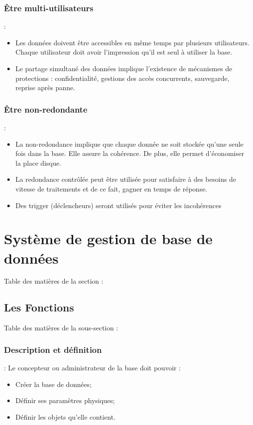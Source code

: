 \documentclass[10pt]{beamer}
\newcommand{\tocsss}{\begin{frame}[allowframebreaks]{Table des matières de la sous-section : \subsecname}
    \tableofcontents[
    currentsection,
    currentsubsection,
    hideothersubsections,
    sectionstyle=hide/hide
]
\end{frame}}
\newcommand{\tocss}{
    \begin{frame}[allowframebreaks]{Table des matières de la section : \secname}
    \tableofcontents[
        currentsection,
        currentsubsection,
        hideothersubsections,
        sectionstyle=show/hide,
    ]
\end{frame}}
\begin{document}
\subsubsection{Être multi-utilisateurs}
\begin{frame}{\subsecname : \subsubsecname}
    \begin{itemize}
        \item Les données doivent être accessibles en même temps par plusieurs utilisateurs.
              Chaque utilisateur doit avoir l’impression qu’il est seul à utiliser la base.
        \item Le partage simultané des données implique l’existence de mécanismes de protections : confidentialité, gestions des accès concurrents, sauvegarde, reprise après panne.
    \end{itemize}
\end{frame}

\subsubsection{Être non-redondante}
\begin{frame}{\subsecname : \subsubsecname}
    \begin{itemize}
        \item La non-redondance implique que chaque donnée ne soit stockée qu’une seule fois dans la base.  Elle assure la cohérence. De plus, elle permet d’économiser la place disque.
        \item La redondance contrôlée peut être utilisée pour satisfaire à des besoins de vitesse de traitements et de ce fait, gagner en temps de réponse.
        \item Des trigger (déclencheurs) seront utilisés pour éviter les incohérences
    \end{itemize}
\end{frame}


\section{Système de gestion de base de données}
\tocss

\subsection{Les Fonctions}
\tocsss


\subsubsection{Description et définition}
\begin{frame}{\subsecname : \subsubsecname}
    Le concepteur ou administrateur de la base doit pouvoir :
    \begin{itemize}
        \item Créer la base de données;
        \item Définir ses paramètres physiques;
        \item Définir les objets qu’elle contient.
    \end{itemize}
\end{frame}
\end{document}
